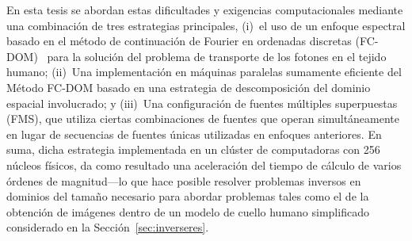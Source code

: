 En esta tesis se abordan estas dificultades y exigencias computacionales 
mediante una combinación de tres estrategias principales, (i)~el uso de
un enfoque espectral basado en el método de continuación de Fourier 
en ordenadas discretas
(FC-DOM)~\cite{Gaggioli2019} para la solución del 
problema de transporte de los fotones en el tejido humano; (ii)~Una implementación 
en máquinas paralelas sumamente eficiente del
Método FC-DOM basado en una estrategia de descomposición del dominio espacial 
involucrado; y (iii)~Una configuración de fuentes múltiples superpuestas (FMS), que utiliza ciertas combinaciones de fuentes que operan simultáneamente en lugar de
secuencias de fuentes únicas utilizadas en enfoques anteriores. En suma, 
dicha estrategia 
implementada en un clúster de computadoras con 256 núcleos físicos, da como resultado una aceleración del tiempo de cálculo de varios órdenes de
magnitud---lo que hace posible resolver problemas inversos en dominios del 
tamaño necesario para abordar 
problemas tales como el de la obtención de imágenes dentro de un modelo de cuello
humano simplificado considerado en la Sección~\ref{sec:inverseres}.

